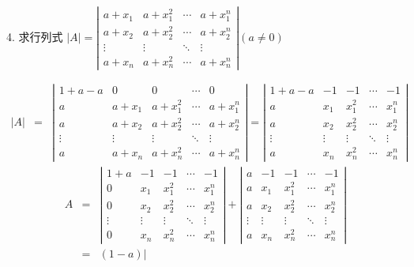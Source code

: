 4. 求行列式 $|A|=\left|\begin{matrix}
	a+x_{1}&a+x_{1}^2&\cdots&a+x_{1}^n\\
	a+x_{2}&a+x_{2}^2&\cdots&a+x_{2}^n\\
	\vdots&\vdots&\ddots&\vdots\\
	a+x_{n}&a+x_{n}^2&\cdots&a+x_{n}^n
\end{matrix} \right| (a\neq 0)$
\begin{solution}
	\begin{eqnarray*}
		|A|&=&\left|\begin{matrix}
			1+a-a&0&0&\cdots&0\\
			a&a+x_{1}&a+x_{1}^2&\cdots&a+x_{1}^n\\
			a&a+x_{2}&a+x_{2}^2&\cdots&a+x_{2}^n\\
			\vdots&\vdots&\vdots&\ddots&\vdots\\
			a&a+x_{n}&a+x_{n}^2&\cdots&a+x_{n}^n
		\end{matrix} \right|
		=\left|\begin{matrix}
			1+a-a&-1&-1&\cdots&-1\\
			a&x_{1}&x_{1}^2&\cdots&x_{1}^n\\
			a&x_{2}&x_{2}^2&\cdots&x_{2}^n\\
			\vdots&\vdots&\vdots&\ddots&\vdots\\
			a&x_{n}&x_{n}^2&\cdots&x_{n}^n
		\end{matrix} \right|
	\end{eqnarray*}
	\begin{eqnarray*}
		A&=&\left|\begin{matrix}
			1+a&-1&-1&\cdots&-1\\
			0&x_{1}&x_{1}^2&\cdots&x_{1}^n\\
			0&x_{2}&x_{2}^2&\cdots&x_{2}^n\\
			\vdots&\vdots&\vdots&\ddots&\vdots\\
			0&x_{n}&x_{n}^2&\cdots&x_{n}^n
		\end{matrix} \right|+\left|\begin{matrix}
			a&-1&-1&\cdots&-1\\
			a&x_{1}&x_{1}^2&\cdots&x_{1}^n\\
			a&x_{2}&x_{2}^2&\cdots&x_{2}^n\\
			\vdots&\vdots&\vdots&\ddots&\vdots\\
			a&x_{n}&x_{n}^2&\cdots&x_{n}^n
		\end{matrix} \right|\\
		&=&(1-a)\left|\begin{matrix}

\end{matrix}
\end{eqnarray*}
\end{solution}
